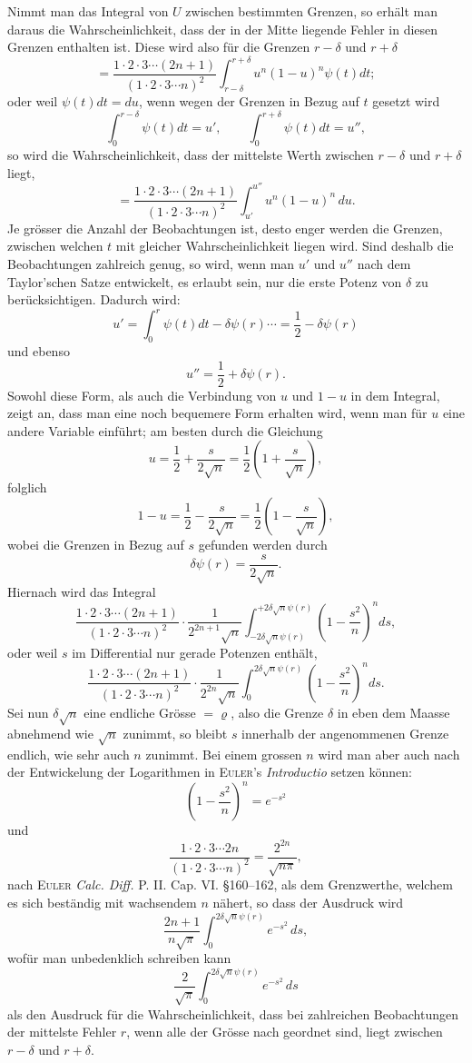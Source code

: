 \documentclass[11pt]{article}
\newcommand{\scn}[1]{\textsc{#1}}
\begin{document}
Nimmt man das Integral von $U$ zwischen bestimmten Grenzen, so erhält man daraus die Wahrscheinlichkeit, dass der in der Mitte liegende Fehler in diesen Grenzen enthalten ist. Diese wird also für die Grenzen $r-\delta$ und $r+\delta$
\[
 =\frac{1\cdot2\cdot3\cdots(2n+1)}{(1\cdot2\cdot3\cdots n)^2}\int_{r-\delta}^{r+\delta}u^n(1-u)^n\psi(t)dt;
\]
oder weil $\psi(t)dt=du$, wenn wegen der Grenzen in Bezug auf $t$ gesetzt wird
\[
 \int_0^{r-\delta}\psi(t)dt=u',\qquad \int_0^{r+\delta}\psi(t)dt=u'',
\]
so wird die Wahrscheinlichkeit, dass der mittelste Werth zwischen $r-\delta$ und $r+\delta$ liegt,
\[
 =\frac{1\cdot2\cdot3\cdots(2n+1)}{(1\cdot2\cdot3\cdots n)^2}\int_{u'}^{u''}u^n(1-u)^n\,du.
\]
Je grösser die Anzahl der Beobachtungen ist, desto enger werden die Grenzen, zwischen welchen $t$ mit gleicher Wahrscheinlichkeit liegen wird. Sind deshalb die Beobachtungen zahlreich genug, so wird, wenn man $u'$ und $u''$ nach dem Taylor'schen Satze entwickelt, es erlaubt sein, nur die erste Potenz von $\delta$ zu berücksichtigen. Dadurch wird:
\[
 u'=\int_0^r\psi(t)dt-\delta\psi(r)\cdots=\frac12-\delta\psi(r)
\]
und ebenso
\[
 u''=\frac12+\delta\psi(r).
\]
Sowohl diese Form, als auch die Verbindung von $u$ und $1-u$ in dem Integral, zeigt an, dass man eine noch bequemere Form erhalten wird, wenn man für $u$ eine andere Variable einführt; am besten durch die Gleichung
\[
 u=\frac12+\frac{s}{2\sqrt n}=\frac12\left(1+\frac{s}{\sqrt n}\right),
\]
folglich
\[
 1-u=\frac12-\frac{s}{2\sqrt n}=\frac12\left(1-\frac{s}{\sqrt n}\right),
\]
wobei die Grenzen in Bezug auf $s$ gefunden werden durch
\[
 \delta\psi(r)=\frac{s}{2\sqrt n}.
\]
Hiernach wird das Integral
\[
 \frac{1\cdot2\cdot3\cdots(2n+1)}{(1\cdot2\cdot3\cdots n)^2}\cdot\frac{1}{2^{2n+1}\sqrt n}\int_{-2\delta\sqrt n\psi(r)}^{+2\delta\sqrt n\psi(r)}\left(1-\frac{s^2}{n}\right)^n ds,
\]
oder weil $s$ im Differential nur gerade Potenzen enthält,
\[
 \frac{1\cdot2\cdot3\cdots(2n+1)}{(1\cdot2\cdot3\cdots n)^2}\cdot\frac{1}{2^{2n}\sqrt n}\int_0^{2\delta\sqrt n\psi(r)}\left(1-\frac{s^2}{n}\right)^n ds.
\]
Sei nun $\delta\sqrt n$ eine endliche Grösse $=\varrho$, also die Grenze $\delta$ in eben dem Maasse abnehmend wie $\sqrt n$ zunimmt, so bleibt $s$ innerhalb der angenommenen Grenze endlich, wie sehr auch $n$ zunimmt. Bei einem grossen $n$ wird man aber auch nach der Entwickelung der Logarithmen in \scn{Euler}'s \emph{Introductio} setzen können:
\[
 \left(1-\frac{s^2}{n}\right)^n=e^{-s^2}
\]
und
\[
 \frac{1\cdot2\cdot3\cdots2n}{(1\cdot2\cdot3\cdots n)^2}=\frac{2^{2n}}{\sqrt{n\pi}},
\]
nach \scn{Euler} \emph{Calc. Diff.} P. II. Cap. VI. \S 160--162, als dem Grenzwerthe, welchem es sich beständig mit wachsendem $n$ nähert, so dass der Ausdruck wird
\[
 \frac{2n+1}{n\sqrt\pi}\int_0^{2\delta\sqrt n\psi(r)}e^{-s^2}\,ds,
\]
wofür man unbedenklich schreiben kann
\[
 \frac2{\sqrt\pi}\int_0^{2\delta\sqrt n\psi(r)}e^{-s^2}\,ds
\]
als den Ausdruck für die Wahrscheinlichkeit, dass bei zahlreichen Beobachtungen der mittelste Fehler $r$, wenn alle der Grösse nach geordnet sind, liegt zwischen $r-\delta$ und $r+\delta$.
\end{document}
